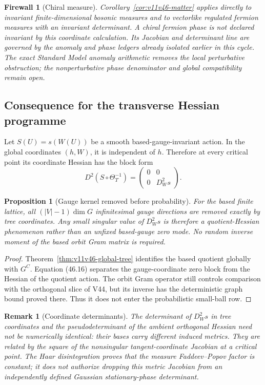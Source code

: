 \documentclass[11pt]{article}
\newtheorem{proposition}[theorem]{Proposition}
\newtheorem{remark}[theorem]{Remark}
\newtheorem{firewall}[theorem]{Firewall}
\begin{document}
\begin{firewall}[Chiral measure]
\label{fire:v11v46-chiral}
Corollary~\ref{cor:v11v46-matter} applies directly to invariant
finite-dimensional bosonic measures and to vectorlike regulated
fermion measures with an invariant determinant.  A chiral fermion
phase is not declared invariant by this coordinate calculation.  Its
Jacobian and determinant line are governed by the anomaly and phase
ledgers already isolated earlier in this cycle.  The exact Standard
Model anomaly arithmetic removes the local perturbative obstruction;
the nonperturbative phase denominator and global compatibility remain
open.
\end{firewall}

\subsection{Consequence for the transverse Hessian programme}

Let \(S(U)=s(W(U))\) be a smooth based-gauge-invariant action.  In the
global coordinates \((h,W)\), it is independent of \(h\).  Therefore
at every critical point its coordinate Hessian has the block form
\[
             D^2(S\circ\Theta_T^{-1})
              =\begin{pmatrix}0&0\\0&D_W^2s\end{pmatrix}.      \tag{46.16}
\]

\begin{proposition}[Gauge kernel removed before probability]
\label{prop:v11v46-kernel-removed}
For the based finite lattice, all \((|V|-1)\dim G\) infinitesimal gauge
directions are removed exactly by tree coordinates.  Any small
singular value of \(D_W^2s\) is therefore a quotient-Hessian
phenomenon rather than an unfixed based-gauge zero mode.  No random
inverse moment of the based orbit Gram matrix is required.
\end{proposition}

\begin{proof}
Theorem~\ref{thm:v11v46-global-tree} identifies the based quotient
globally with \(G^C\).  Equation (46.16) separates the gauge-coordinate
zero block from the Hessian of the quotient action.  The orbit Gram
operator still controls comparison with the orthogonal slice of V44,
but its inverse has the deterministic graph bound proved there.
Thus it does not enter the probabilistic small-ball row.
\end{proof}

\begin{remark}[Coordinate determinants]
The determinant of \(D_W^2s\) in tree coordinates and the
pseudodeterminant of the ambient orthogonal Hessian need not be
numerically identical: their bases carry different induced metrics.
They are related by the square of the nonsingular tangent-coordinate
Jacobian at a critical point.  The Haar disintegration proves that the
measure Faddeev--Popov factor is constant; it does not authorize
dropping this metric Jacobian from an independently defined Gaussian
stationary-phase determinant.
\end{remark}
\end{document}
